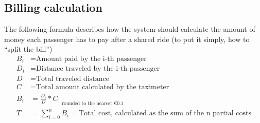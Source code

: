 \subsection{Billing calculation}
The following formula describes how the system should calculate the amount of money each passenger
has to pay after a shared ride (to put it simply, how to ``split the bill'') %
\begin{align*}
 B_{i} &= \text{Amount paid by the i-th passenger} \\
 D_{i} &= \text{Distance traveled by the i-th passenger} \\
 D &= \text{Total traveled distance} \\
 C &= \text{Total amount calculated by the taximeter} \\
 B_{i} &= \frac{D_{i}}{D} * C |_{\substack{\text{rounded to the nearest €0.1 }}} \\
 T &= \sum_{i=0}^{n} B_{i} = \text{Total cost, calculated as the sum of the n partial costs}
\end{align*}